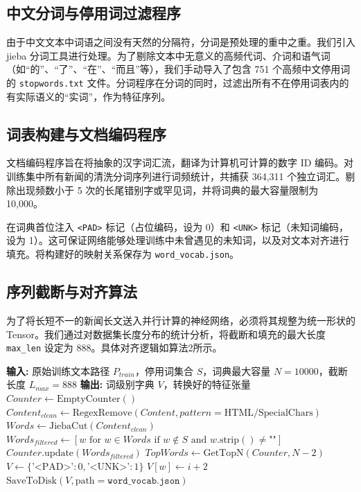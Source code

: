 \documentclass[UTF8,a4paper,11pt]{ctexart}
\begin{document}
\subsection{中文分词与停用词过滤程序}
由于中文文本中词语之间没有天然的分隔符，分词是预处理的重中之重。我们引入 jieba 分词工具进行处理。为了剔除文本中无意义的高频代词、介词和语气词（如“的”、“了”、“在”、“而且”等），我们手动导入了包含 751 个高频中文停用词的 \texttt{stopwords.txt} 文件。分词程序在分词的同时，过滤出所有不在停用词表内的有实际语义的“实词”，作为特征序列。

\subsection{词表构建与文档编码程序}
文档编码程序旨在将抽象的汉字词汇流，翻译为计算机可计算的数字 ID 编码。对训练集中所有新闻的清洗分词序列进行词频统计，共捕获 364,311 个独立词汇。剔除出现频数小于 5 次的长尾错别字或罕见词，并将词典的最大容量限制为 10,000。

在词典首位注入 \texttt{<PAD>} 标记（占位编码，设为 0）和 \texttt{<UNK>} 标记（未知词编码，设为 1）。这可保证网络能够处理训练中未曾遇见的未知词，以及对文本对齐进行填充。将构建好的映射关系保存为 \texttt{word\_vocab.json}。

\subsection{序列截断与对齐算法}
为了将长短不一的新闻长文送入并行计算的神经网络，必须将其规整为统一形状的 Tensor。我们通过对数据集长度分布的统计分析，将截断和填充的最大长度 \texttt{max\_len} 设定为 888。具体对齐逻辑如算法2所示。

\begin{algorithm}[H]
\caption{数据基本清洗、分词与字典编码算法}
\label{alg:preprocess}
\begin{algorithmic}[1]
\State \textbf{输入:} 原始训练文本路径 $P_{train}$，停用词集合 $S$，词典最大容量 $N = 10000$，截断长度 $L_{max} = 888$
\State \textbf{输出:} 词级别字典 $V$，转换好的特征张量
\State $Counter \gets \text{EmptyCounter}()$
    \State $Content_{clean} \gets \text{RegexRemove}(Content, pattern = \text{HTML/SpecialChars})$ 
    \State $Words \gets \text{JiebaCut}(Content_{clean})$
    \State $Words_{filtered} \gets [w \text{ for } w \in Words \text{ if } w \notin S \text{ and } w.\text{strip}() \neq \text{""}]$
    \State $Counter.\text{update}(Words_{filtered})$
\EndFor
\State $TopWords \gets \text{GetTopN}(Counter, N - 2)$ 
\State $V \gets \{ \text{'<PAD>'} : 0, \text{'<UNK>'} : 1 \}$
    \State $V[w] \gets i + 2$
\EndFor
\State $\text{SaveToDisk}(V, \text{path}=\texttt{word\_vocab.json})$
\end{algorithmic}
\end{algorithm}
\end{document}
